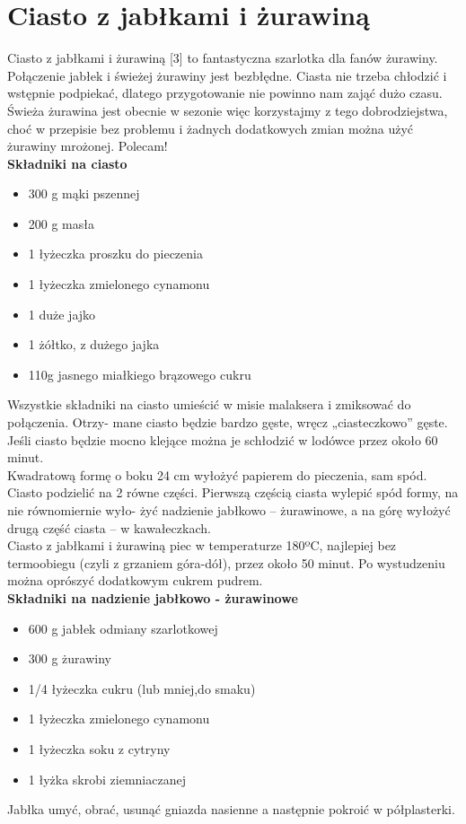 \documentclass[12pt, letterpaper, titlepage]{article}
\begin{document}
\section{Ciasto z jabłkami i żurawiną}
Ciasto z jabłkami i żurawiną [3] to fantastyczna szarlotka dla fanów żurawiny. Połączenie
jabłek i świeżej żurawiny jest bezbłędne. Ciasta nie trzeba chłodzić i wstępnie podpiekać,
dlatego przygotowanie nie powinno nam zająć dużo czasu. Świeża żurawina jest obecnie w
sezonie więc korzystajmy z tego dobrodziejstwa, choć w przepisie bez problemu i żadnych
dodatkowych zmian można użyć żurawiny mrożonej. Polecam!\\
\newline
\textbf{Składniki na ciasto}
\newline
\begin{itemize}
\item 300 g mąki pszennej
\item 200 g masła
\item 1 łyżeczka proszku do pieczenia
\item 1 łyżeczka zmielonego cynamonu
\item 1 duże jajko
\item 1 żółtko, z dużego jajka
\item 110g jasnego miałkiego brązowego cukru
\end{itemize}
Wszystkie składniki na ciasto umieścić w misie malaksera i zmiksować do połączenia. Otrzy-
mane ciasto będzie bardzo gęste, wręcz „ciasteczkowo” gęste. Jeśli ciasto będzie mocno klejące
można je schłodzić w lodówce przez około 60 minut. \\

\noindent Kwadratową formę o boku 24 cm wyłożyć papierem do pieczenia, sam spód. Ciasto podzielić
na 2 równe części. Pierwszą częścią ciasta wylepić spód formy, na nie równomiernie wyło-
żyć nadzienie jabłkowo – żurawinowe, a na górę wyłożyć drugą część ciasta – w kawałeczkach. \\

\noindent Ciasto z jabłkami i żurawiną piec w temperaturze 180ºC, najlepiej bez termoobiegu (czyli
z grzaniem góra-dół), przez około 50 minut. Po wystudzeniu można oprószyć dodatkowym
cukrem pudrem. \\
\newline
\textbf{Składniki na nadzienie jabłkowo - żurawinowe}
\newline
\begin{itemize}
\item 600 g jabłek odmiany szarlotkowej
\item 300 g żurawiny
\item 1/4 łyżeczka cukru (lub mniej,do smaku)
\item 1 łyżeczka zmielonego cynamonu
\item 1 łyżeczka soku z cytryny
\item 1 łyżka skrobi ziemniaczanej
\end{itemize}
\newpage
\noindent Jabłka umyć, obrać, usunąć gniazda nasienne a następnie pokroić w półplasterki.\\
\end{document}
